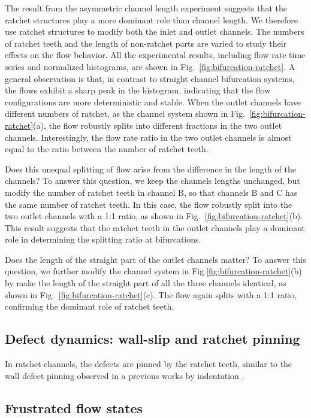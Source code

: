 \documentclass[%
10pt,
superscriptaddress,
twocolumn,
 amsmath,amssymb,
 aps,prx,
]{revtex4-2}
\begin{document}
The result from the asymmetric channel length experiment suggests that the ratchet structures play a more dominant role than channel length.
We therefore use ratchet structures to modify both the inlet and outlet channels.
The numbers of ratchet teeth and the length of non-ratchet parts are varied to study their effects on the flow behavior. 
All the experimental results, including flow rate time series and normalized histograms, are shown in Fig.~\ref{fig:bifurcation-ratchet}.
A general observation is that, in contrast to straight channel bifurcation systems, the flows exhibit a sharp peak in the histogram, indicating that the flow configurations are more deterministic and stable.
When the outlet channels have different numbers of ratchet, as the channel system shown in Fig.~\ref{fig:bifurcation-ratchet}(a), the flow robustly splits into different fractions in the two outlet channels.
Interestingly, the flow rate ratio in the two outlet channels is almost equal to the ratio between the number of ratchet teeth.

Does this unequal splitting of flow arise from the difference in the length of the channels?
To answer this question, we keep the channels lengths unchanged, but modify the number of ratchet teeth in channel B, so that channels B and C has the same number of ratchet teeth.
In this case, the flow robustly split into the two outlet channels with a 1:1 ratio, as shown in Fig.~\ref{fig:bifurcation-ratchet}(b).
This result suggests that the ratchet teeth in the outlet channels play a dominant role in determining the splitting ratio at bifurcations.

Does the length of the straight part of the outlet channels matter?
To answer this question, we further modify the channel system in Fig.\ref{fig:bifurcation-ratchet}(b) by make the length of the straight part of all the three channels identical, as shown in Fig.~\ref{fig:bifurcation-ratchet}(c).
The flow again splits with a 1:1 ratio, confirming the dominant role of ratchet teeth.


\subsection{Defect dynamics: wall-slip and ratchet pinning}

In ratchet channels, the defects are pinned by the ratchet teeth, similar to the wall defect pinning observed in a previous works by indentation \cite{Hardouin2022}.

\subsection{Frustrated flow states}
\end{document}

